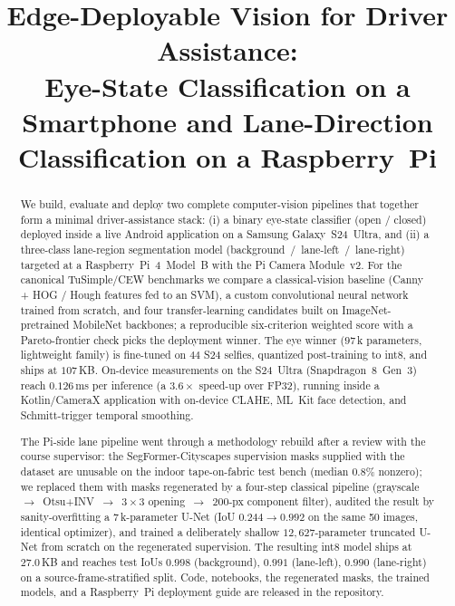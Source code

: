 \documentclass[conference]{IEEEtran}
\begin{document}
\title{Edge-Deployable Vision for Driver Assistance:\\
Eye-State Classification on a Smartphone and Lane-Direction
Classification on a Raspberry~Pi}

\author{
}

\maketitle

\begin{abstract}
We build, evaluate and deploy two complete computer-vision pipelines
that together form a minimal driver-assistance stack: (i) a binary
eye-state classifier (open / closed) deployed inside a live Android
application on a Samsung Galaxy~S24~Ultra, and (ii) a three-class
lane-region segmentation model (background~/~lane-left~/~lane-right)
targeted at a Raspberry~Pi~4~Model~B with the Pi Camera Module~v2.
For the canonical TuSimple/CEW benchmarks we compare a classical-vision
baseline (Canny + HOG / Hough features fed to an SVM), a custom
convolutional neural network trained from scratch, and four
transfer-learning candidates built on ImageNet-pretrained MobileNet
backbones; a reproducible six-criterion weighted score with a
Pareto-frontier check picks the deployment winner. The eye winner
($97$\,k parameters, lightweight family) is fine-tuned on $44$ S24
selfies, quantized post-training to int8, and ships at $107$\,KB.
On-device measurements on the S24~Ultra (Snapdragon~8~Gen~3) reach
$0.126$\,ms per inference (a $3.6\times$ speed-up over FP32), running
inside a Kotlin/CameraX application with on-device CLAHE, ML~Kit face
detection, and Schmitt-trigger temporal smoothing.

The Pi-side lane pipeline went through a methodology rebuild after a
review with the course supervisor: the SegFormer-Cityscapes
supervision masks supplied with the dataset are unusable on the
indoor tape-on-fabric test bench (median $0.8\%$ nonzero); we
replaced them with masks regenerated by a four-step classical
pipeline (grayscale~$\rightarrow$~Otsu+INV~$\rightarrow$~$3\!\times\!3$
opening~$\rightarrow$~$200$-px component filter), audited the result
by sanity-overfitting a $7$\,k-parameter U-Net (IoU
$0.244\!\rightarrow\!0.992$ on the same 50 images, identical
optimizer), and trained a deliberately shallow $12{,}627$-parameter
truncated U-Net from scratch on the regenerated supervision. The
resulting int8 model ships at $27.0$\,KB and reaches test IoUs
$0.998$ (background), $0.991$ (lane-left), $0.990$ (lane-right) on
a source-frame-stratified split.
Code, notebooks, the regenerated masks, the trained models, and a
Raspberry~Pi deployment guide are released in the repository.
\end{abstract}
\end{document}
